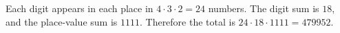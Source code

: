 Each digit appears in each place in $4\cdot3\cdot2=24$ numbers. The digit sum is $18$, and the place-value sum is $1111$. Therefore the total is $\boxed{24\cdot18\cdot1111=479952}$.
